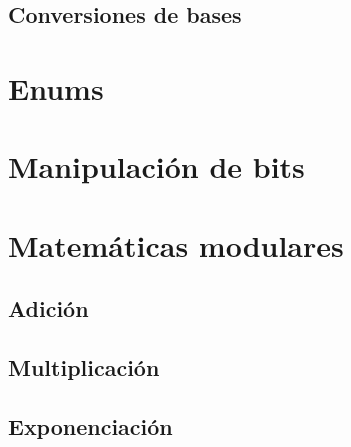 \documentclass{article}
\begin{document}
\subsection{Conversiones de bases}

\section{Enums}

\section{Manipulación de bits}

\section{Matemáticas modulares}

\subsection{Adición}

\subsection{Multiplicación}

\subsection{Exponenciación}
\end{document}
